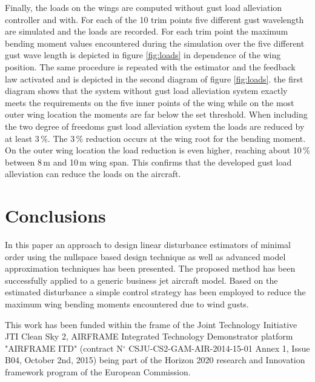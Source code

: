 \documentclass[graybox]{svmult}
\begin{document}
Finally, the loads on the wings are computed without gust load alleviation controller and with. For each of the 10 trim points five different gust wavelength are simulated and the loads are recorded. For each trim point the maximum bending moment values  encountered during the simulation over the five different gust wave length is depicted in figure \ref{fig:loads} in dependence of the wing position. The same procedure is repeated with the estimator and the feedback law activated and is depicted in the second diagram of figure \ref{fig:loads}. the first diagram shows that the system without gust load alleviation system exactly meets the requirements on the five inner  points of the wing while on the most outer wing location the moments are far below the set threshold. When including the two degree of freedoms gust load alleviation system the loads are reduced by at least 3\,\%. The 3\,\% reduction occurs at the wing root for the bending moment. On the outer wing location the load reduction is even higher, reaching about 10\,\% between 8\,m and 10\,m wing span.
This confirms that the developed gust load alleviation can reduce the loads on the aircraft.

\section{Conclusions}
In this paper an approach to design linear disturbance estimators of minimal order using the nullspace based design technique as well as advanced model approximation techniques has been presented. The proposed method has been successfully applied to a generic business jet aircraft model. Based on the estimated disturbance a simple control strategy has been employed to reduce the maximum wing bending moments encountered due to wind gusts.



\begin{acknowledgement}
This work has been funded within the frame of the Joint Technology Initiative JTI Clean Sky 2, AIRFRAME Integrated Technology Demonstrator platform "AIRFRAME ITD" (contract N$^\circ$ CSJU-CS2-GAM-AIR-2014-15-01 Annex 1, Issue B04, October 2nd, 2015) being part of the Horizon 2020 research and Innovation framework program of the European Commission.
\end{acknowledgement}
%




%
\end{document}

